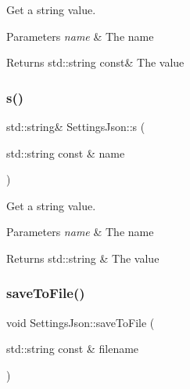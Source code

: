 Get a string value. 


\begin{DoxyParams}{Parameters}
{\em name} & The name \\
\hline
\end{DoxyParams}
\begin{DoxyReturn}{Returns}
std\+::string const\& The value 
\end{DoxyReturn}
\mbox{\label{class_settings_json_a28b88888063d5efe00ef2d8488129f2e}} 
\subsubsection{\texorpdfstring{s()}{s()}\hspace{0.1cm}{\footnotesize\ttfamily [2/2]}}
{\footnotesize\ttfamily std\+::string\& Settings\+Json\+::s (\begin{DoxyParamCaption}\item[{std\+::string const \&}]{name }\end{DoxyParamCaption})\hspace{0.3cm}{\ttfamily [inline]}}



Get a string value. 


\begin{DoxyParams}{Parameters}
{\em name} & The name \\
\hline
\end{DoxyParams}
\begin{DoxyReturn}{Returns}
std\+::string \& The value 
\end{DoxyReturn}
\mbox{\label{class_settings_json_a5def57414c2a77c94452447d23a89f8e}} 
\subsubsection{\texorpdfstring{save\+To\+File()}{saveToFile()}}
{\footnotesize\ttfamily void Settings\+Json\+::save\+To\+File (\begin{DoxyParamCaption}\item[{std\+::string const \&}]{filename }\end{DoxyParamCaption})}



